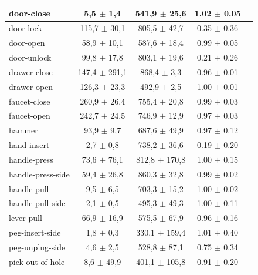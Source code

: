 \documentclass{article}
\theoremstyle{plain}
\theoremstyle{definition}
\theoremstyle{remark}
\begin{document}
\begin{table}[H]
{\begin{tabular}{|l|c|c|c|c|}
door-close                & 5,5 $\pm$ 1,4     & 541,9 $\pm$ 25,6  &               1.02 $\pm$ 0.05     \\ \hline
door-lock                 & 115,7 $\pm$ 30,1  & 805,5 $\pm$ 42,7  &               0.35 $\pm$ 0.36     \\ \hline
door-open                 & 58,9 $\pm$ 10,1   & 587,6 $\pm$ 18,4  &               0.99 $\pm$ 0.05     \\ \hline
door-unlock               & 99,8 $\pm$ 17,8   & 803,1 $\pm$ 19,6  &               0.21 $\pm$ 0.26     \\ \hline
drawer-close              & 147,4 $\pm$ 291,1 & 868,4 $\pm$ 3,3   &               0.96 $\pm$ 0.01     \\ \hline
drawer-open               & 126,3 $\pm$ 23,3  & 492,9 $\pm$ 2,5   &               1.00 $\pm$ 0.01     \\ \hline
faucet-close              & 260,9 $\pm$ 26,4  & 755,4 $\pm$ 20,8  &               0.99 $\pm$ 0.03     \\ \hline
faucet-open               & 242,7 $\pm$ 24,5  & 746,9 $\pm$ 12,9  &               0.97 $\pm$ 0.03     \\ \hline
hammer                    & 93,9 $\pm$ 9,7    & 687,6 $\pm$ 49,9  &               0.97 $\pm$ 0.12     \\ \hline
hand-insert               & 2,7 $\pm$ 0,8     & 738,2 $\pm$ 36,6  &               0.19 $\pm$ 0.20     \\ \hline
handle-press              & 73,6 $\pm$ 76,1   & 812,8 $\pm$ 170,8 &               1.00 $\pm$ 0.15     \\ \hline
handle-press-side         & 59,4 $\pm$ 26,8   & 860,3 $\pm$ 32,8  &               0.99 $\pm$ 0.02     \\ \hline
handle-pull               & 9,5 $\pm$ 6,5     & 703,3 $\pm$ 15,2  &               1.00 $\pm$ 0.02     \\ \hline
handle-pull-side          & 2,1 $\pm$ 0,5     & 495,3 $\pm$ 49,3  &               1.00 $\pm$ 0.11     \\ \hline
lever-pull                & 66,9 $\pm$ 16,9   & 575,5 $\pm$ 67,9  &               0.96 $\pm$ 0.16     \\ \hline
peg-insert-side           & 1,8 $\pm$ 0,3     & 330,1 $\pm$ 159,4 &               1.01 $\pm$ 0.40     \\ \hline
peg-unplug-side           & 4,6 $\pm$ 2,5     & 528,8 $\pm$ 87,1  &               0.75 $\pm$ 0.34     \\ \hline
pick-out-of-hole          & 8,6 $\pm$ 49,9    & 401,1 $\pm$ 105,8 &               0.91 $\pm$ 0.20     \\ \hline

\end{tabular}}
\end{table}
\end{document}
